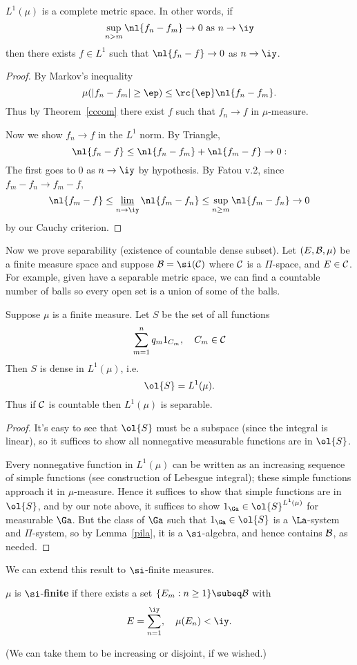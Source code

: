 \begin{thm}
$L^1(\mu)$ is a complete metric space. In other words, if
\[
\sup_{n>m}\nl{f_n-f_m}\to 0\text{ as } n\to \iy
\]
then there exists $f\in L^1$ such that $\nl{f_n-f}\to 0$ as $n\to \iy$.
\end{thm}
\begin{proof}
By Markov's inequality
\[
\mu(|f_n-f_m|\ge \ep)
\le \rc{\ep}\nl{f_n-f_m}.
\]
Thus by Theorem~\ref{cccom} there exist $f$ such that $f_n\to f$ in $\mu$-measure.

Now we show $f_n\to f$ in the $L^1$ norm. By Triangle,
\[
\nl{f_n-f}\le \nl{f_n-f_m}+\nl{f_m-f}\to 0:
\]
The first goes to 0 as $n\to \iy$ by hypothesis. By Fatou v.2, since $f_m-f_n\to f_m-f$,
\[
\nl{f_m-f}\le \varliminf_{n\to \iy} \nl{
f_m-f_n
}
\le
\sup_{n\ge m} \nl{f_m-f_n}\to 0
\]
by our Cauchy criterion.
\end{proof}

Now we prove separability (existence of countable dense subset). Let $(E,\cal B, \mu)$ be a finite measure space and suppose $\cal B=\si(\cal C)$ where $\cal C$ is a $\Pi$-space, and $E\in \cal C$. For example, given have a separable metric space, we can find a countable number of balls so every open set is a union of some of the balls. 
\begin{thm}
Suppose $\mu$ is a finite measure.
Let $S$ be the set of all functions
\[
\sum_{m=1}^n q_m1_{C_m}, \quad C_m\in \cal C
\]
Then $S$ is dense in $L^1(\mu)$, i.e.
\[
\ol{S}=L^1(\mu).
\]
Thus if $\cal C$ is countable then $L^1(\mu)$ is separable.
\end{thm}
\begin{proof}
It's easy to see that $\ol{S}$ must be a subspace (since the integral is linear), so it suffices to show all nonnegative measurable functions are in $\ol{S}$.

Every nonnegative function in $L^1(\mu)$ can be written as an increasing sequence of simple functions (see construction of Lebesgue integral); these simple functions approach it in $\mu$-measure. Hence it suffices to show that simple functions are in $\ol{S}$, and by our note above, it suffices to show $1_{\Ga}\in \ol{S}^{L^1(\mu)}$ for measurable $\Ga$. But the class of $\Ga$ such that $1_{\Ga}\in \ol{S}$ is a $\La$-system and $\Pi$-system, so by Lemma~\ref{pila}, it is a $\si$-algebra, and hence contains $\cal B$, as needed.
\end{proof}
We can extend this result to $\si$-finite measures.
\begin{df}
$\mu$ is $\si$-\textbf{finite} if there exists a set $\{E_m:n\ge 1\}\subeq \cal B$ with
\[
E=\sum_{n=1}^{\iy},\quad \mu(E_n)<\iy.
\]
\end{df}
(We can take them to be increasing or disjoint, if we wished.)

